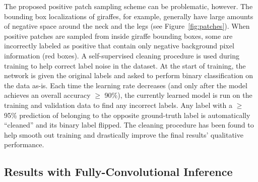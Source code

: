 The proposed positive patch sampling scheme can be problematic, however.  The bounding box localizations of giraffes, for example, generally have large amounts of negative space around the neck and the legs (see Figure~\ref{fig:patches}).  When positive patches are sampled from inside giraffe bounding boxes, some are incorrectly labeled as positive that contain only negative background pixel information (red boxes).  A self-supervised cleaning procedure is used during training to help correct label noise in the dataset.  At the start of training, the network is given the original labels and asked to perform binary classification on the data as-is.  Each time the learning rate decreases (and only after the model achieves an overall accuracy $\geq$ 90\%), the currently learned model is run on the training and validation data to find any incorrect labels.  Any label with a $\geq$ 95\% prediction of belonging to the opposite ground-truth label is automatically ``cleaned'' and its binary label flipped.  The cleaning procedure has been found to help smooth out training and drastically improve the final results' qualitative performance.

\subsection{Results with Fully-Convolutional Inference}

